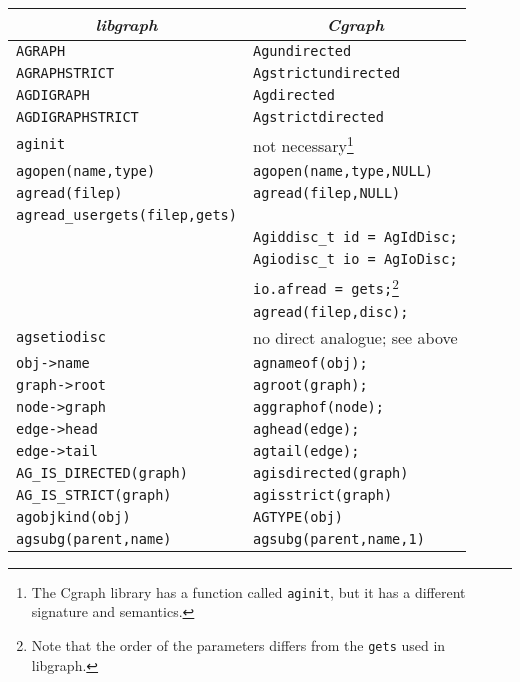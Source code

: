 \documentclass[11pt,letterpaper]{article}
\begin{document}
\begin{savenotes}
\begin{table*}[htb]
\centering
\begin{tabular}{|l|l|} \hline
\multicolumn{1}{|c|}{\em libgraph} & \multicolumn{1}{c|}{\em Cgraph} \\ \hline
\verb"AGRAPH"  &  \verb"Agundirected" \\ \hline
\verb"AGRAPHSTRICT" &  \verb"Agstrictundirected" \\ \hline
\verb"AGDIGRAPH" &  \verb"Agdirected" \\ \hline
\verb"AGDIGRAPHSTRICT"  &  \verb"Agstrictdirected" \\ \hline
\verb"aginit" &  not necessary\footnote{The Cgraph library has a function called \texttt{aginit}, but it has a different signature and semantics.} \\ \hline
\verb"agopen(name,type)" &  \verb"agopen(name,type,NULL)"\\ \hline
\verb"agread(filep)" &  \verb"agread(filep,NULL)"\\ \hline
\verb"agread_usergets(filep,gets)" \\
                            &  \verb"Agiddisc_t id = AgIdDisc;" \\
                            &  \verb"Agiodisc_t io = AgIoDisc;" \\
                            &  \verb"io.afread = gets;"\footnote{Note that the order of the parameters differs from the \texttt{gets} used in libgraph.} \\
                            &  \verb"agread(filep,disc);"\\ \hline
\verb"agsetiodisc" &  no direct analogue; see above \\ \hline
\verb"obj->name"   &  \verb"agnameof(obj);" \\ \hline
\verb"graph->root"   &  \verb"agroot(graph);" \\ \hline
\verb"node->graph"   &  \verb"aggraphof(node);" \\ \hline
\verb"edge->head"   &  \verb"aghead(edge);" \\ \hline
\verb"edge->tail"   &  \verb"agtail(edge);" \\ \hline
\verb"AG_IS_DIRECTED(graph)" &  \verb"agisdirected(graph)"  \\ \hline
\verb"AG_IS_STRICT(graph)" &  \verb"agisstrict(graph)"  \\ \hline
\verb"agobjkind(obj)" &  \verb"AGTYPE(obj)" \\ \hline
\verb"agsubg(parent,name)"      &   \verb"agsubg(parent,name,1)" \\ \hline

\end{tabular}
\end{table*}
\end{savenotes}
\end{document}
